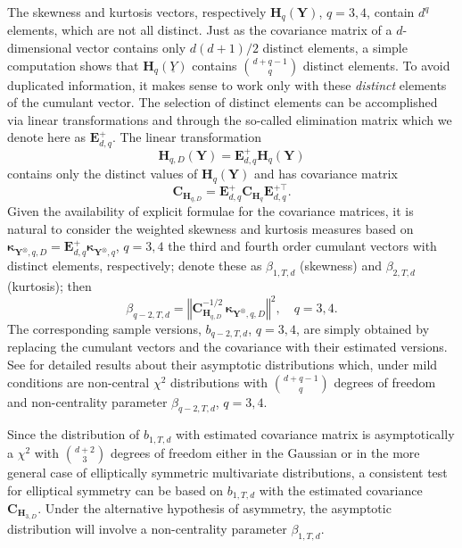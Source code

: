 The skewness and kurtosis vectors, respectively \(\mathbf{H}_{q}(\mathbf{Y})\), \(q=3,4\), contain \(d^{q}\) elements, which are not all distinct. Just as the covariance matrix of a
\(d\)-dimensional vector contains only \(d(d+1)/2\) distinct elements, a simple computation shows that \(\mathbf{H}_q (\underline{Y})\) contains \(d+q-1 \choose q\) distinct elements. To avoid duplicated information, it makes sense to work only with these \textit{distinct} elements of the cumulant vector. The selection of distinct elements can be accomplished via linear transformations and through the so-called elimination matrix which we denote here as \(\mathbf{E}_{d,q}^{+}\). The linear transformation
\begin{equation}
\mathbf{H}_{q,D}\left({\mathbf{Y}}\right)={\mathbf{E}%
}_{d,q}^{+}\mathbf{H}_{q}\left(  \mathbf{Y}\right)
\label{eq:LTA}
\end{equation}
contains only the distinct values of \(\mathbf{H}_{q}(\mathbf{Y})\) and has covariance matrix
\begin{equation}
\mathbf{C}_{\mathbf{H}_{q,D} } =  {\mathbf{E}_{d,q}^{+}}
\mathbf{C}_{\mathbf{H}_q}{\mathbf{E}_{d,q}^{+\top}}.
\label{eq:LTB}
\end{equation}
Given the availability of explicit formulae for the covariance matrices, it is natural to consider the weighted skewness and kurtosis measures based on
\(\boldsymbol{\kappa}_{\mathbf{Y}^\otimes,q,D}={\mathbf{E}}_{d,q}^{+}\boldsymbol{\kappa}_{\mathbf{Y}^\otimes,q}\), \(q=3,4\) the third and fourth order cumulant vectors with distinct elements, respectively; denote these as \(\beta_{1,T,d}\) (skewness) and \(\beta_{2,T,d}\) (kurtosis); then
\begin{equation}
\beta_{q-2,T,d}=\left\Vert \mathbf{C}_{\mathbf{H}_{q,D}}^{-1/2} \, \boldsymbol{\kappa}_{\mathbf{Y}^\otimes,q,D} \right\Vert^2, \quad q=3,4.
\label{eq:WSK}
\end{equation}
The corresponding sample versions, \(b_{q-2,T,d}\), \(q=3,4\), are simply obtained by replacing the cumulant vectors and the covariance with their estimated versions. See \citet{jamma2021SJS} for detailed results about their asymptotic distributions which, under mild conditions are non-central \(\chi^2\) distributions with \(d+q-1 \choose q\) degrees of freedom and non-centrality parameter \(\beta_{q-2,T,d}\), \(q=3,4\).

Since the distribution of \(b_{1,T,d}\) with estimated covariance matrix is asymptotically a \(\chi^2\) with \(d+2 \choose 3\) degrees of freedom either in the Gaussian or in the more general case of elliptically symmetric multivariate distributions, a consistent test for elliptical symmetry can be based on \(b_{1,T,d}\) with the estimated covariance \(\mathbf{C}_{\mathbf{H}_{3,D}}\). Under the alternative hypothesis of asymmetry, the asymptotic distribution will involve a non-centrality parameter \(\beta_{1,T,d}\).

